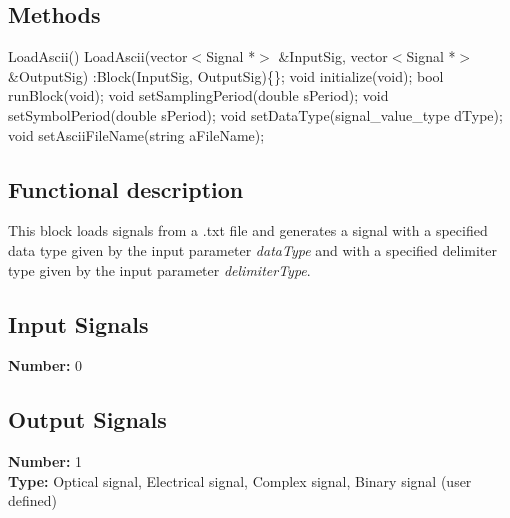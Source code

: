 \subsection*{Methods}

LoadAscii() {}
\bigbreak
LoadAscii(vector$<$Signal *$>$ \&InputSig, vector$<$Signal *$>$ \&OutputSig) :Block(InputSig, OutputSig)\{\};
\bigbreak
void initialize(void);
\bigbreak
bool runBlock(void);
\bigbreak
void setSamplingPeriod(double sPeriod);
\bigbreak
void setSymbolPeriod(double sPeriod);
\bigbreak
void setDataType(signal\_value\_type dType);
\bigbreak
void setAsciiFileName(string aFileName);

\subsection*{Functional description}

This block loads signals from a .txt file and generates a signal with a specified data type given by the input parameter \textit{dataType} and with a specified delimiter type given by the input parameter \textit{delimiterType}.

\subsection*{Input Signals}

\textbf{Number:} 0

\subsection*{Output Signals}

\textbf{Number:} 1\\
\textbf{Type:} Optical signal, Electrical signal, Complex signal, Binary signal (user defined)

